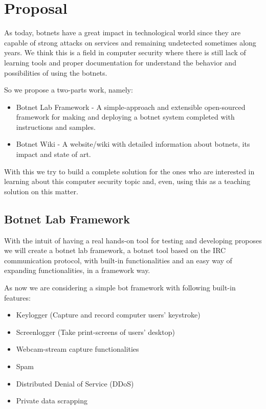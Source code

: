 \documentclass[]{article}
\begin{document}
\section{Proposal}

As today, botnets have a great impact in technological world since they are capable of strong attacks on services and remaining undetected sometimes along years. We think this is a field in computer security where there is still lack of learning tools and proper documentation for understand the behavior and possibilities of using the botnets.

So we propose a two-parts work, namely:
\begin{itemize}
	\item Botnet Lab Framework - A simple-approach and extensible open-sourced framework for making and deploying a botnet system completed with instructions and samples.
	\item Botnet Wiki - A website/wiki with detailed information about botnets, its impact and state of art.
\end{itemize}

With this we try to build a complete solution for the ones who are interested in learning about this computer security topic and, even, using this as a teaching solution on this matter.

\subsection{Botnet Lab Framework}

With the intuit of having a real hands-on tool for testing and developing proposes we will create a botnet lab framework, a botnet tool based on the IRC communication protocol, with built-in functionalities and an easy way of expanding functionalities, in a framework way.

As now we are considering a simple bot framework with following built-in features:

\begin{itemize}
	\item Keylogger (Capture and record computer users' keystroke)
	\item Screenlogger (Take print-screens of users' desktop)
	\item Webcam-stream capture functionalities
	\item Spam
	\item Distributed Denial of Service (DDoS)
	\item Private data scrapping
\end{itemize}
\end{document}
